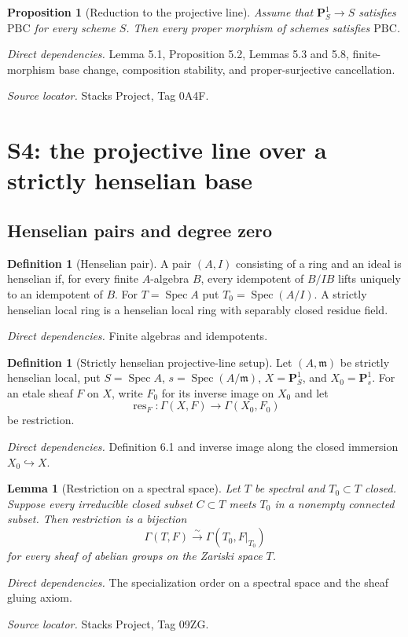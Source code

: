 \documentclass[10pt]{article}
\newtheorem{proposition}[theorem]{Proposition}
\newtheorem{lemma}[theorem]{Lemma}
\theoremstyle{definition}
\newtheorem{definition}[theorem]{Definition}
\newcommand{\Spec}{\operatorname{Spec}}
\newcommand{\deps}[1]{\par\smallskip\textit{Direct dependencies.} #1\par}
\newcommand{\sources}[1]{\par\textit{Source locator.} #1\par}
\begin{document}
\begin{proposition}[Reduction to the projective line]
Assume that $\mathbf P^1_S\to S$ satisfies $\mathrm{PBC}$ for every
scheme $S$.  Then every proper morphism of schemes satisfies
$\mathrm{PBC}$.
\end{proposition}
\deps{Lemma 5.1, Proposition 5.2, Lemmas 5.3 and 5.8, finite-morphism base
change, composition stability, and proper-surjective cancellation.}
\sources{Stacks Project, Tag 0A4F.}

\section{S4: the projective line over a strictly henselian base}

\subsection{Henselian pairs and degree zero}

\begin{definition}[Henselian pair]
A pair $(A,I)$ consisting of a ring and an ideal is henselian if, for every
finite $A$-algebra $B$, every idempotent of $B/IB$ lifts uniquely to an
idempotent of $B$.  For $T=\Spec A$ put $T_0=\Spec(A/I)$.  A strictly
henselian local ring is a henselian local ring with separably closed
residue field.
\end{definition}
\deps{Finite algebras and idempotents.}

\begin{definition}[Strictly henselian projective-line setup]
Let $(A,\mathfrak m)$ be strictly henselian local, put
$S=\Spec A$, $s=\Spec(A/\mathfrak m)$,
$X=\mathbf P^1_S$, and $X_0=\mathbf P^1_s$.  For an etale sheaf $F$ on
$X$, write $F_0$ for its inverse image on $X_0$ and let
\[
 \operatorname{res}_F:\Gamma(X,F)\longrightarrow\Gamma(X_0,F_0)
\]
be restriction.
\end{definition}
\deps{Definition 6.1 and inverse image along the closed immersion
$X_0\hookrightarrow X$.}

\begin{lemma}[Restriction on a spectral space]
Let $T$ be spectral and $T_0\subset T$ closed.  Suppose every irreducible
closed subset $C\subset T$ meets $T_0$ in a nonempty connected subset.
Then restriction is a bijection
\[
 \Gamma(T,F)\xrightarrow{\sim}\Gamma(T_0,F|_{T_0})
\]
for every sheaf of abelian groups on the Zariski space $T$.
\end{lemma}
\deps{The specialization order on a spectral space and the sheaf gluing
axiom.}
\sources{Stacks Project, Tag 09ZG.}
\end{document}
